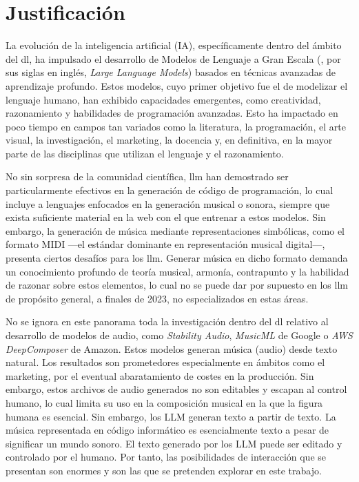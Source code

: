 \chapter{Justificación}

La evolución de la inteligencia artificial (IA), específicamente dentro del ámbito del \gls{dl}, ha impulsado el desarrollo de Modelos de Lenguaje a Gran Escala (, por sus siglas en inglés, \textit{Large Language Models}) basados en técnicas avanzadas de aprendizaje profundo. Estos modelos, cuyo primer objetivo fue el de modelizar el lenguaje humano, han exhibido capacidades emergentes, como creatividad, razonamiento y habilidades de programación avanzadas. Esto ha impactado en poco tiempo en campos tan variados como la literatura, la programación, el arte visual, la investigación, el marketing, la docencia y, en definitiva, en la mayor parte de las disciplinas que utilizan el lenguaje y el razonamiento.

No sin sorpresa de la comunidad científica, \gls{llm} han demostrado ser particularmente efectivos en la generación de código de programación, lo cual incluye a lenguajes enfocados en la generación musical o sonora, siempre que exista suficiente material en la web con el que entrenar a estos modelos. Sin embargo, la generación de música mediante representaciones simbólicas, como el formato MIDI —el estándar dominante en representación musical digital—, presenta ciertos desafíos para los \gls{llm}. Generar música en dicho formato demanda un conocimiento profundo de teoría musical, armonía, contrapunto y la habilidad de razonar sobre estos elementos, lo cual no se puede dar por supuesto en los \gls{llm} de propósito general, a finales de 2023, no especializados en estas áreas.

No se ignora en este panorama toda la investigación dentro del \gls{dl} relativo al desarrollo de modelos de audio, como \textit{Stability Audio}, \textit{MusicML} de Google o \textit{AWS DeepComposer} de Amazon. Estos modelos generan música (audio) desde texto natural. Los resultados son prometedores especialmente en ámbitos como el marketing, por el eventual abaratamiento de costes en la producción. Sin embargo, estos archivos de audio generados no son editables y escapan al control humano, lo cual limita su uso en la composición musical en la que la figura humana es esencial. Sin embargo, los LLM generan texto a partir de texto. La música representada en código informático es esencialmente texto a pesar de significar un mundo sonoro. El texto generado por los LLM puede ser editado y controlado por el humano. Por tanto, las posibilidades de interacción que se presentan son enormes y son las que se pretenden explorar en este trabajo.

